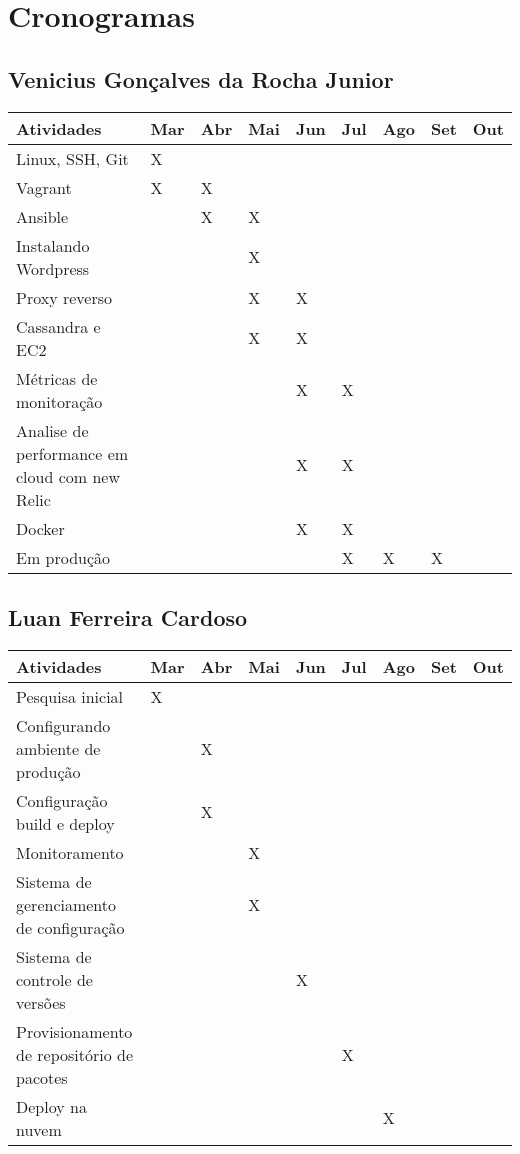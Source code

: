 \chapter{Cronogramas}
\section{Venicius Gonçalves da Rocha Junior}

\begin{center}
\begin{tabular}{ | m{20em} | m{0.5cm}| m{0.5cm} |
m{0.5cm} | m{0.5cm} | 
m{0.5cm} |m{0.5cm} |m{0.5cm} |m{0.5cm} | } 
\hline
 Atividades & Mar & Abr & Mai & Jun & 
 Jul & Ago & Set & Out \\ 
\hline
Linux, SSH, Git & X & & & & & & &  \\ 
\hline
Vagrant & X & X & & & & & & \\ 
\hline
Ansible &  & X & X & & & & & \\
\hline
Instalando Wordpress &  & & X & & & & & \\
\hline
Proxy reverso &  & & X & X & & & & \\
\hline
Cassandra e EC2 &  & & X & X & & & & \\
\hline
Métricas de monitoração &  & & & X & X & & & \\
\hline
Analise de performance em cloud com new Relic &  & & & X & X & & & \\
\hline
Docker &  & & & X & X & & & \\
\hline
Em produção &  & & &  & X & X & X & \\
 


\hline
\end{tabular}
\end{center}

\section{Luan Ferreira Cardoso}
\begin{center}
\begin{tabular}{ | m{20em} | m{0.5cm}| m{0.5cm} |
m{0.5cm} | m{0.5cm} | 
m{0.5cm} |m{0.5cm} |m{0.5cm} |m{0.5cm} | } 
\hline
 Atividades & Mar & Abr & Mai & Jun & 
 Jul & Ago & Set & Out \\ 
\hline
Pesquisa inicial & X & & & & & & &  \\ 
\hline
Configurando ambiente de produção &  & X & & & & & & \\ 
\hline
Configuração build e deploy &  & X & & & & & & \\
\hline
Monitoramento &  & & X & & & & & \\
\hline
Sistema de gerenciamento de configuração &  & & X & & & & & \\
\hline
Sistema de controle de versões &  & & & X & & & & \\
\hline
Provisionamento de repositório de pacotes &  & & & & X & & & \\
\hline
Deploy na nuvem &  & & & & & X & & \\
 

\hline
\end{tabular}
\end{center}

